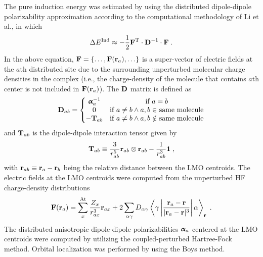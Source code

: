 The pure induction energy was estimated by using the distributed
dipole\hyp{}dipole polarizability approximation according to the computational
methodology of Li et al.,\cite{Li.Netzloff.Gordon.JCP.2006}
in which
%
\begin{equation}\label{e:ind-ref}
 \Delta E^{\rm Ind} \approx - \frac{1}{2} {\bf F}^{\rm T} \cdot {\bf D}^{-1} \cdot {\bf F} \;.
\end{equation}
%
In the above equation, ${\bf F} = \{ \ldots, {\bf F}({\bf r}_a), \ldots\}$
is a super\hyp{}vector of electric fields at the $a$th distributed site
due to the surrounding unperturbed molecular charge densities in the complex
(i.e., the charge\hyp{}density of the molecule that contains $a$th center
is not included in ${\bf F}({\bf r}_a)$).
The ${\bf D}$ matrix is defined as
%
\begin{equation}
 {\bf D}_{ab} = 
\left\{\begin{matrix}
{\bm{\upalpha}}_a^{-1} &\text{if $a=b$} \\ 
0                    &\text{if $a\ne b \land a,b \in$ same molecule}\\ 
-{\bf T}_{ab}        &\text{if $a\ne b \land a,b \notin$ same molecule}
\end{matrix}\right.
\end{equation}
%
and ${\bf T}_{ab}$ is the dipole\hyp{}dipole interaction tensor
given by
%
\begin{equation}
 {\bf T}_{ab} \equiv \frac{3}{r_{ab}^5} {\bf r}_{ab} \otimes {\bf r}_{ab}
  - \frac{1}{r_{ab}^3} {\bf 1} \;,
\end{equation}
%
with ${\bf r}_{ab} \equiv {\bf r}_{a} - {\bf r}_{b}$ being the
relative distance between the LMO centroids.
The electric fields at the LMO centroids were computed from
the unperturbed HF charge\hyp{}density distributions
%
\begin{equation}
 {\bf F}({\bf r}_a) = \sum_x^{\rm At} \frac{Z_x}{r_{ax}^3} {\bf r}_{ax} 
  + 2 \sum_{\alpha\gamma} D_{\alpha\gamma} 
  \left< \gamma \left| 
    \frac{{\bf r}_a - {\bf r}}{\vert {\bf r}_a - {\bf r} \vert^3}
               \right| \alpha \right>_{\bf r} \;.
\end{equation}
%
The distributed anisotropic dipole\hyp{}dipole
polarizabilities ${\bm{\upalpha}}_a$ centered at the LMO centroids
were computed by utilizing the coupled\hyp{}perturbed Hartree\hyp{}Fock
method.\cite{McWeeny.RevModPhys.1960,Dodds.McWeeney.Sadlej.MolPhys.1977} 
Orbital localization was performed by using the Boys method.\cite{Boys.RevModPhys.1960} 

